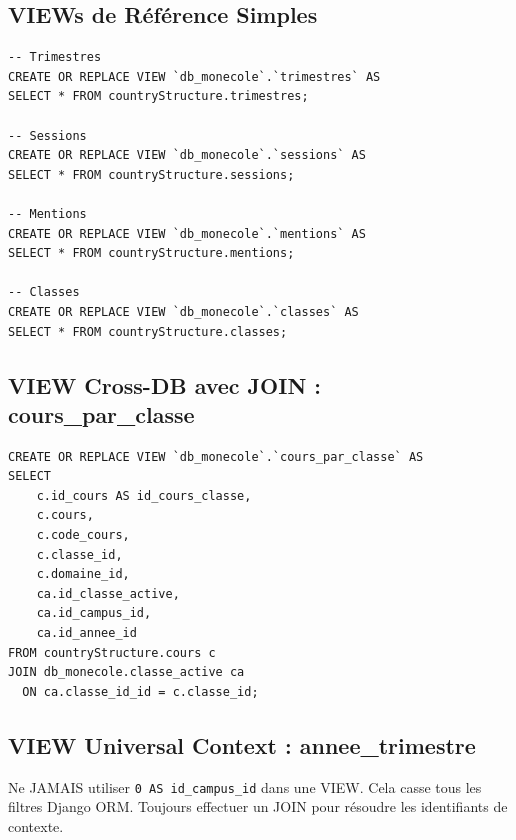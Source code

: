 \documentclass[12pt,a4paper,oneside]{report}
\begin{document}
\subsection{VIEWs de Référence Simples}

\begin{lstlisting}[style=sql, title=VIEWs 1:1 vers le Hub]
-- Trimestres
CREATE OR REPLACE VIEW `db_monecole`.`trimestres` AS
SELECT * FROM countryStructure.trimestres;

-- Sessions
CREATE OR REPLACE VIEW `db_monecole`.`sessions` AS
SELECT * FROM countryStructure.sessions;

-- Mentions
CREATE OR REPLACE VIEW `db_monecole`.`mentions` AS
SELECT * FROM countryStructure.mentions;

-- Classes
CREATE OR REPLACE VIEW `db_monecole`.`classes` AS
SELECT * FROM countryStructure.classes;
\end{lstlisting}

\subsection{VIEW Cross-DB avec JOIN : cours\_par\_classe}

\begin{lstlisting}[style=sql, title=VIEW avec jointure cross-BDD]
CREATE OR REPLACE VIEW `db_monecole`.`cours_par_classe` AS
SELECT 
    c.id_cours AS id_cours_classe,
    c.cours,
    c.code_cours,
    c.classe_id,
    c.domaine_id,
    ca.id_classe_active,
    ca.id_campus_id,
    ca.id_annee_id
FROM countryStructure.cours c
JOIN db_monecole.classe_active ca 
  ON ca.classe_id_id = c.classe_id;
\end{lstlisting}

\subsection{VIEW Universal Context : annee\_trimestre}

\begin{pitfallbox}
Ne JAMAIS utiliser \texttt{0 AS id\_campus\_id} dans une VIEW. Cela casse tous les filtres Django ORM. Toujours effectuer un JOIN pour résoudre les identifiants de contexte.
\end{pitfallbox}
\end{document}
